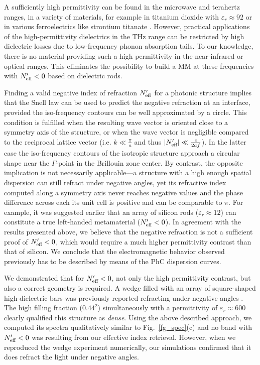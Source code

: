 A sufficiently high permittivity can be found in the microwave and terahertz ranges, in a variety of materials, for example in titanium dioxide with $\varepsilon_r \approx 92$ \cite{nemec2009tunable} or in various ferroelectrics like strontium titanate \cite{skoromets2011tuning}. However, practical applications of the high-permittivity dielectrics in the THz range can be restricted by high dielectric losses due to low-frequency phonon absorption tails. To our knowledge, there is no material providing such a high permittivity in the near-infrared or optical ranges. This eliminates the possibility to build a MM at these frequencies with $N_{\text{eff} }'<0$ based on dielectric rods.

Finding a valid negative index of refraction $N_{\text{eff} }'$ for a photonic structure implies that the Snell law can be used to predict the negative refraction at an interface, provided the iso-frequency contours can be well approximated by a circle. This condition is fulfilled when the resulting wave vector is oriented close to a symmetry axis of the structure, or when the wave vector is negligible compared to the reciprocal lattice vector (i.e. $k\ll \frac{\pi}{a}$ and thus $|N_{\text{eff} }'| \ll \frac{c}{2af}$).  In the latter case the iso-frequency contours of the isotropic structure approach a circular shape near the $\Gamma$-point in the Brillouin zone center.  By contrast, the opposite implication is not necessarily applicable---a structure with a high enough spatial dispersion can still refract under negative angles, yet its refractive index computed along a symmetry axis never reaches negative values and the phase difference across each its unit cell is positive and can be comparable to $\pi$.  For example, it was suggested earlier  \cite{vynck2009all} that an array of silicon rods ($\varepsilon_r \approx 12$) can constitute a true left-handed metamaterial ($N_{\text{eff} }'<0$).  In agreement with the results presented above, we believe that the negative refraction is not a sufficient proof of $N_{\text{eff} }'<0$, which would require a much higher permittivity contrast than that of silicon.  We conclude that the electromagnetic behavior observed previously \cite{vynck2009all} has to be described by means of the PhC dispersion curves. 

We demonstrated that for $N_{\text{eff} }'<0$, not only the high permittivity contrast, but also a correct geometry is required. A wedge filled with an array of square-shaped high-dielectric bars was previously reported refracting under negative angles \cite{peng2007}. The high filling fraction ($0.44^{2}$) simultaneously with a permittivity of $\varepsilon_r \approx 600$ clearly qualified this structure as \textit{dense}. Using the above described approach, we computed its spectra qualitatively similar to Fig.~\ref{fg_spec}(c) and no band with $N_{\text{eff} }' < 0$ was resulting from our effective index retrieval. However, when we reproduced the wedge experiment numerically, our simulations confirmed that it does refract the light under negative angles.

